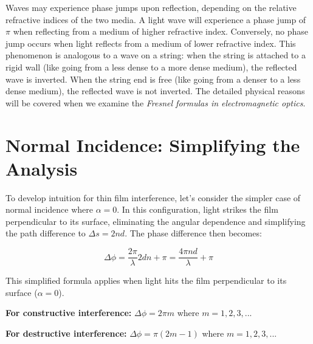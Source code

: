 \documentclass[
  a4paper,
]{book}
\begin{document}
\begin{tcolorbox}[enhanced jigsaw, breakable, toptitle=1mm, bottomrule=.15mm, colbacktitle=quarto-callout-note-color!10!white, title=\textcolor{quarto-callout-note-color}{\faInfo}\hspace{0.5em}{Phase Jump at Boundaries}, arc=.35mm, rightrule=.15mm, bottomtitle=1mm, opacityback=0, toprule=.15mm, coltitle=black, leftrule=.75mm, opacitybacktitle=0.6, colback=white, left=2mm, titlerule=0mm, colframe=quarto-callout-note-color-frame]

Waves may experience phase jumps upon reflection, depending on the
relative refractive indices of the two media. A light wave will
experience a phase jump of \(\pi\) when reflecting from a medium of
higher refractive index. Conversely, no phase jump occurs when light
reflects from a medium of lower refractive index. This phenomenon is
analogous to a wave on a string: when the string is attached to a rigid
wall (like going from a less dense to a more dense medium), the
reflected wave is inverted. When the string end is free (like going from
a denser to a less dense medium), the reflected wave is not inverted.
The detailed physical reasons will be covered when we examine the
\emph{Fresnel formulas in electromagnetic optics}.

\end{tcolorbox}

\section{Normal Incidence: Simplifying the
Analysis}\label{normal-incidence-simplifying-the-analysis}

To develop intuition for thin film interference, let's consider the
simpler case of normal incidence where \(\alpha=0\). In this
configuration, light strikes the film perpendicular to its surface,
eliminating the angular dependence and simplifying the path difference
to \(\Delta s = 2nd\). The phase difference then becomes:

\begin{tcolorbox}[enhanced jigsaw, breakable, toptitle=1mm, bottomrule=.15mm, colbacktitle=quarto-callout-tip-color!10!white, title=\textcolor{quarto-callout-tip-color}{\faLightbulb}\hspace{0.5em}{Phase Difference at Normal Incidence}, arc=.35mm, rightrule=.15mm, bottomtitle=1mm, opacityback=0, toprule=.15mm, coltitle=black, leftrule=.75mm, opacitybacktitle=0.6, colback=white, left=2mm, titlerule=0mm, colframe=quarto-callout-tip-color-frame]

\[\Delta \phi=\frac{2\pi}{\lambda}2dn+\pi = \frac{4\pi nd}{\lambda}+\pi\]

This simplified formula applies when light hits the film perpendicular
to its surface (\(\alpha = 0\)).

\textbf{For constructive interference:} \(\Delta \phi = 2\pi m\) where
\(m = 1, 2, 3, ...\)

\textbf{For destructive interference:} \(\Delta \phi = \pi(2m-1)\) where
\(m = 1, 2, 3, ...\)

\end{tcolorbox}
\end{document}
